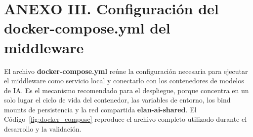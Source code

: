 \documentclass[11pt,a4paper]{article}
\begin{document}

\section*{\normalfont ANEXO III. Configuración del docker-compose.yml del middleware}
\label{anx:docker_compose}

\renewcommand{\thetable}{III.\arabic{table}}
\renewcommand{\theHtable}{anexoIII.table.\arabic{table}}
\setcounter{table}{0}
\renewcommand{\thecodigo}{III.\arabic{codigo}}
\renewcommand{\theHcodigo}{anexoIII.codigo.\arabic{codigo}}
\setcounter{codigo}{0}
\renewcommand{\thecomando}{III.\arabic{comando}}
\renewcommand{\theHcomando}{anexoIII.comando.\arabic{comando}}
\setcounter{comando}{0}
\renewcommand{\thefigure}{III.\arabic{figure}}
\renewcommand{\theHfigure}{anexoIII.figure.\arabic{figure}}
\setcounter{figure}{0}

El archivo \textbf{docker-compose.yml} reúne la configuración necesaria para ejecutar el middleware como servicio local y conectarlo con los contenedores de modelos de IA. Es el mecanismo recomendado para el despliegue, porque concentra en un solo lugar el ciclo de vida del contenedor, las variables de entorno, los bind mounts de persistencia y la red compartida \textbf{elan-ai-shared}. El Código~\ref{fig:docker_compose} reproduce el archivo completo utilizado durante el desarrollo y la validación.
\end{document}
